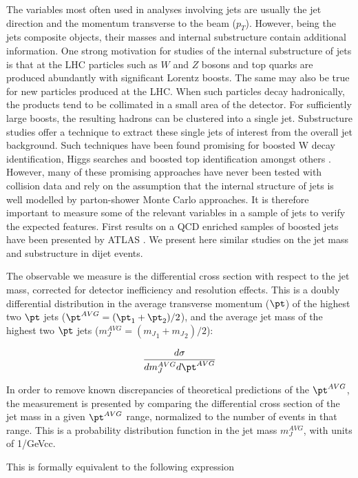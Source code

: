  The variables most often used in analyses involving jets are usually the jet direction and the momentum transverse to the beam ($p_T$). 
However, being  the jets composite objects, their masses and internal substructure contain additional information.
One strong motivation for studies of the internal substructure of jets is that at the LHC particles such as $W$ and $Z$ bosons and top quarks are produced abundantly with significant Lorentz boosts. The same may also be true for new particles produced at the LHC. When
 such particles decay hadronically, the products tend to be collimated in a small area of the detector. For sufficiently large boosts, the resulting hadrons can be clustered into a single jet. Substructure studies offer a technique to extract these single jets of interest from the overall jet background. Such techniques have been found promising for boosted W decay identification, Higgs searches and boosted top identification amongst others \cite{jetsub}. However, many of these promising approaches have never been tested with collision data and rely on the assumption that the internal structure of jets is well modelled by parton-shower Monte Carlo approaches. It is therefore important to measure some of the relevant variables in a sample of jets to verify the expected features. First results on a QCD enriched samples of boosted jets have been presented by ATLAS \cite{atlasJS}. We present here similar studies on the jet mass and substructure in dijet events. 


The observable we measure is the differential cross section with respect to the jet mass,
corrected for detector inefficiency and resolution effects. This is a doubly
differential distribution in the average transverse momentum ($\pt$) of
the highest two $\pt$ jets ($\pt^{AVG} = ({\pt}_1 + {\pt}_2) / 2$), and 
the average jet mass of the highest two $\pt$ jets ($m_J^{AVG} = ({m_J}_1 + {m_J}_2) / 2$): 

\begin{equation}
\label{eq:dsigmadmjet}
\frac{d\sigma}{dm_J^{AVG} d\pt^{AVG}}
\end{equation}

In order to remove known discrepancies of theoretical predictions of the $\pt^{AVG}$,
the measurement is presented by comparing the differential cross section of the
jet mass in a given $\pt^{AVG}$ range, normalized to the number of events in that
range. This is a probability distribution function in the jet mass $m_J^{AVG}$, 
with units of 1/GeVcc. 

This is formally equivalent to the following expression

